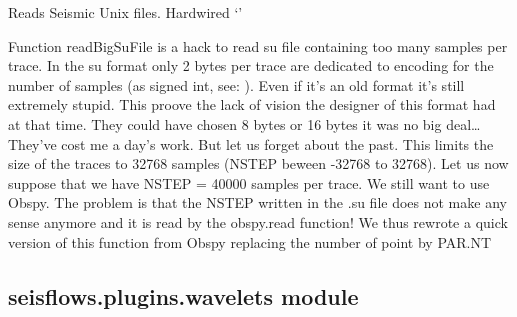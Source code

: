 \documentclass[letterpaper,10pt,english]{sphinxmanual}
\begin{document}
\begin{fulllineitems}
\label{\detokenize{ref/seisflows.plugins:seisflows.plugins.readers.su}}
Reads Seismic Unix files.
Hardwired ‘’

Function readBigSuFile is a hack to read su file containing too many
samples per trace.
In the su format only 2 bytes per trace are dedicated to encoding for
the number of samples (as signed int, see:
).
Even if it’s an old format it’s still extremely stupid.
This proove the lack of vision the designer of this format had at that
time. They could have chosen 8 bytes or 16 bytes it was no big deal…
They’ve cost me a day’s work.
But let us forget about the past. This limits the size of the
traces to 32768 samples (NSTEP beween -32768 to 32768). Let us now
suppose that we have NSTEP = 40000 samples per trace. We still want to
use Obspy. The problem is that the NSTEP written in the .su file does
not make any sense anymore and it is read by the obspy.read function!
We thus rewrote a quick version of this function from Obspy replacing
the number of point by PAR.NT

\end{fulllineitems}



\subsection{seisflows.plugins.wavelets module}
\label{\detokenize{ref/seisflows.plugins:module-seisflows.plugins.wavelets}}\label{\detokenize{ref/seisflows.plugins:seisflows-plugins-wavelets-module}}

\begin{fulllineitems}
\label{\detokenize{ref/seisflows.plugins:seisflows.plugins.wavelets.gabor}}
\end{fulllineitems}

\end{document}
